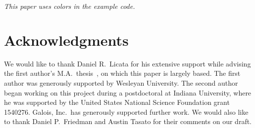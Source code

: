 \documentclass[sigplan, review, timestamp]{acmart}
\begin{document}
\emph{This paper uses colors in the example code.}







\section*{Acknowledgments}

We would like to thank Daniel R.\ Licata for his extensive support
while advising the first author's M.A.\
thesis~\citep{editTimeTactics}, on which this paper is largely based.
The first author was generously supported by Wesleyan University.  The
second author began working on this project during a postdoctoral at
Indiana University, where he was supported by the United States
National Science Foundation grant 1540276. Galois, Inc.\ has
generously supported further work.
We would also like to thank Daniel P.\ Friedman and Austin Tasato for their
comments on our draft.




\end{document}
